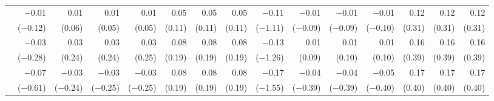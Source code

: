 \begin{tabularx}{1.45\textwidth}{lRRRRRRRRRRRRRR}
		 & \num{-0.01}\phantom{***)} & \num{0.01}\phantom{***)} & \num{0.01}\phantom{***)} & \num{0.01}\phantom{***)} & \num{0.05}\phantom{***)} & \num{0.05}\phantom{***)} & \num{0.05}\phantom{***)} & \num{-0.11}\phantom{***)} & \num{-0.01}\phantom{***)} & \num{-0.01}\phantom{***)} & \num{-0.01}\phantom{***)} & \num{0.12}\phantom{***)} & \num{0.12}\phantom{***)} & \num{0.12}\phantom{***)} \\
		 & (\num{-0.12})\phantom{***} & (\num{0.06})\phantom{***} & (\num{0.05})\phantom{***} & (\num{0.05})\phantom{***} & (\num{0.11})\phantom{***} & (\num{0.11})\phantom{***} & (\num{0.11})\phantom{***} & (\num{-1.11})\phantom{***} & (\num{-0.09})\phantom{***} & (\num{-0.09})\phantom{***} & (\num{-0.10})\phantom{***} & (\num{0.31})\phantom{***} & (\num{0.31})\phantom{***} & (\num{0.31})\phantom{***} \\ [\dspacing]
		 & \num{-0.03}\phantom{***)} & \num{0.03}\phantom{***)} & \num{0.03}\phantom{***)} & \num{0.03}\phantom{***)} & \num{0.08}\phantom{***)} & \num{0.08}\phantom{***)} & \num{0.08}\phantom{***)} & \num{-0.13}\phantom{***)} & \num{0.01}\phantom{***)} & \num{0.01}\phantom{***)} & \num{0.01}\phantom{***)} & \num{0.16}\phantom{***)} & \num{0.16}\phantom{***)} & \num{0.16}\phantom{***)} \\
		 & (\num{-0.28})\phantom{***} & (\num{0.24})\phantom{***} & (\num{0.24})\phantom{***} & (\num{0.25})\phantom{***} & (\num{0.19})\phantom{***} & (\num{0.19})\phantom{***} & (\num{0.19})\phantom{***} & (\num{-1.26})\phantom{***} & (\num{0.09})\phantom{***} & (\num{0.10})\phantom{***} & (\num{0.10})\phantom{***} & (\num{0.39})\phantom{***} & (\num{0.39})\phantom{***} & (\num{0.39})\phantom{***} \\ [\dspacing]
		 & \num{-0.07}\phantom{***)} & \num{-0.03}\phantom{***)} & \num{-0.03}\phantom{***)} & \num{-0.03}\phantom{***)} & \num{0.08}\phantom{***)} & \num{0.08}\phantom{***)} & \num{0.08}\phantom{***)} & \num{-0.17}\phantom{***)} & \num{-0.04}\phantom{***)} & \num{-0.04}\phantom{***)} & \num{-0.05}\phantom{***)} & \num{0.17}\phantom{***)} & \num{0.17}\phantom{***)} & \num{0.17}\phantom{***)} \\
		 & (\num{-0.61})\phantom{***} & (\num{-0.24})\phantom{***} & (\num{-0.25})\phantom{***} & (\num{-0.25})\phantom{***} & (\num{0.19})\phantom{***} & (\num{0.19})\phantom{***} & (\num{0.19})\phantom{***} & (\num{-1.55})\phantom{***} & (\num{-0.39})\phantom{***} & (\num{-0.39})\phantom{***} & (\num{-0.40})\phantom{***} & (\num{0.40})\phantom{***} & (\num{0.40})\phantom{***} & (\num{0.40})\phantom{***} \\ [\dspacing]

\end{tabularx}
